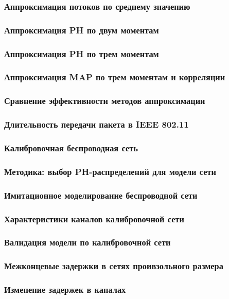 \begin{frame}
    \frametitle{Аппроксимация потоков по среднему значению}
\end{frame}

\begin{frame}
    \frametitle{Аппроксимация PH по двум моментам}
\end{frame}

\begin{frame}
    \frametitle{Аппроксимация PH по трем моментам}
\end{frame}

\begin{frame}
    \frametitle{Аппроксимация MAP по трем моментам и корреляции}
\end{frame}

\begin{frame}
    \frametitle{Сравнение эффективности методов аппроксимации}
\end{frame}

\begin{frame}
    \frametitle{Длительность передачи пакета в IEEE 802.11}
\end{frame}

\begin{frame}
    \frametitle{Калибровочная беспроводная сеть}
\end{frame}

\begin{frame}
    \frametitle{Методика: выбор PH-распределений для модели сети}
\end{frame}

\begin{frame}
    \frametitle{Имитационное моделирование беспроводной сети}
\end{frame}

\begin{frame}
    \frametitle{Характеристики каналов калибровочной сети}
\end{frame}

\begin{frame}
    \frametitle{Валидация модели по калибровочной сети}
\end{frame}

\begin{frame}
    \frametitle{Межконцевые задержки в сетях проивзольного размера}
\end{frame}

\begin{frame}
    \frametitle{Изменение задержек в каналах}
\end{frame}

